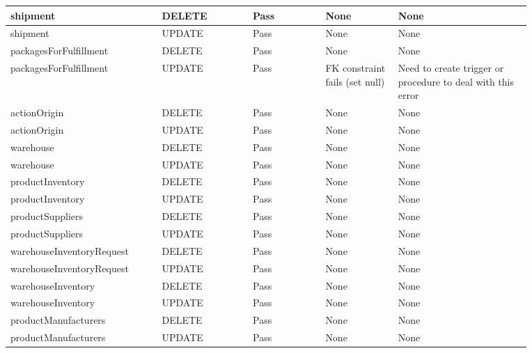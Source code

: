 \begin{spacing}{1.25}
\begin{longtable}{ | p{0.25\linewidth} | p{0.15\linewidth} | p{0.126\linewidth} | p{0.128\linewidth} | p{0.22\linewidth} | }
shipment					&	DELETE		&	Pass		&	None							&	None				\\\hline
shipment					&	UPDATE		&	Pass		&	None							&	None				\\\hline
packagesForFulfillment		&	DELETE		&	Pass		&	None							&	None				\\\hline
packagesForFulfillment		&	UPDATE		&	Pass		&	FK constraint fails (set null)	&	Need to create trigger or procedure to deal with this error\\\hline
actionOrigin				&	DELETE		&	Pass		&	None							&	None				\\\hline
actionOrigin				&	UPDATE		&	Pass		&	None							&	None				\\\hline
warehouse					&	DELETE		&	Pass		&	None							&	None				\\\hline
warehouse					&	UPDATE		&	Pass		&	None							&	None				\\\hline
productInventory			&	DELETE		&	Pass		&	None							&	None				\\\hline
productInventory			&	UPDATE		&	Pass		&	None							&	None				\\\hline
productSuppliers			&	DELETE		&	Pass		&	None							&	None				\\\hline
productSuppliers			&	UPDATE		&	Pass		&	None							&	None				\\\hline
warehouseInventoryRequest	&	DELETE		&	Pass		&	None							&	None				\\\hline
warehouseInventoryRequest	&	UPDATE		&	Pass		&	None							&	None				\\\hline
warehouseInventory			&	DELETE		&	Pass		&	None							&	None				\\\hline
warehouseInventory			&	UPDATE		&	Pass		&	None							&	None				\\\hline
productManufacturers		&	DELETE		&	Pass		&	None							&	None				\\\hline
productManufacturers		&	UPDATE		&	Pass		&	None							&	None				\\\hline
\end{longtable}
\end{spacing}